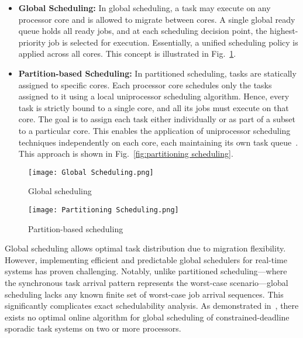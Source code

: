 \documentclass[conference]{IEEEtran}
\begin{document}
\begin{itemize}
    \item \textbf{Global Scheduling:} In global scheduling, a task may execute on any processor core and is allowed to migrate between cores. A single global ready queue holds all ready jobs, and at each scheduling decision point, the highest-priority job is selected for execution. Essentially, a unified scheduling policy is applied across all cores. This concept is illustrated in Fig.~\ref{fig:global scheduling}.
    
    \item \textbf{Partition-based Scheduling:} In partitioned scheduling, tasks are statically assigned to specific cores. Each processor core schedules only the tasks assigned to it using a local uniprocessor scheduling algorithm. Hence, every task is strictly bound to a single core, and all its jobs must execute on that core. The goal is to assign each task either individually or as part of a subset to a particular core. This enables the application of uniprocessor scheduling techniques independently on each core, each maintaining its own task queue~\cite{AbdallahGB24}. This approach is shown in Fig.~\ref{fig:partitioning scheduling}.
\end{itemize}

\begin{figure}[h!]
    \centering
    \texttt{[image: Global Scheduling.png]}
    \caption{Global scheduling \cite{AbdallahGB24}}
    \label{fig:global scheduling}
\end{figure}

\begin{figure}[h!]
    \centering
    \texttt{[image: Partitioning Scheduling.png]}
    \caption{Partition-based scheduling \cite{AbdallahGB24}}
    \label{fig:partitioning scheduling }
\end{figure}

Global scheduling allows optimal task distribution due to migration flexibility. However, implementing efficient and predictable global schedulers for real-time systems has proven challenging. Notably, unlike partitioned scheduling—where the synchronous task arrival pattern represents the worst-case scenario—global scheduling lacks any known finite set of worst-case job arrival sequences. This significantly complicates exact schedulability analysis. As demonstrated in~\cite{sbmbgb}, there exists no optimal online algorithm for global scheduling of constrained-deadline sporadic task systems on two or more processors.
\end{document}
